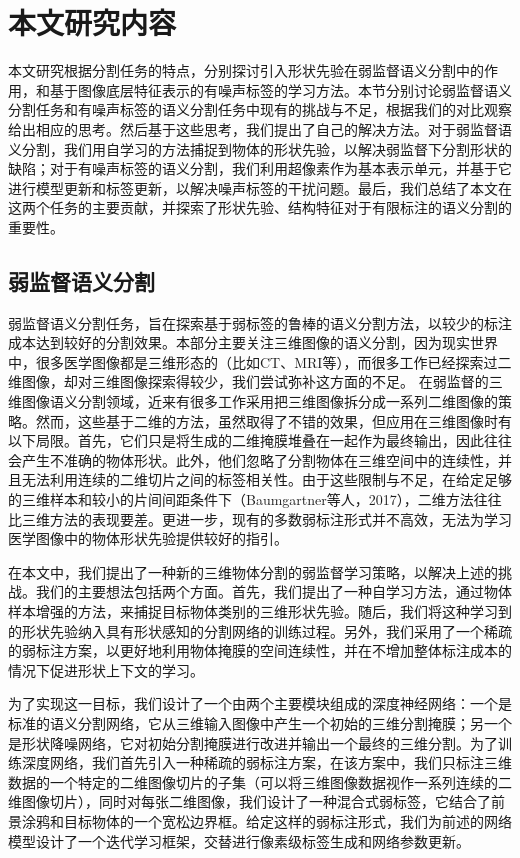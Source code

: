\section{本文研究内容}
本文研究根据分割任务的特点，分别探讨引入形状先验在弱监督语义分割中的作用，和基于图像底层特征表示的有噪声标签的学习方法。本节分别讨论弱监督语义分割任务和有噪声标签的语义分割任务中现有的挑战与不足，根据我们的对比观察给出相应的思考。然后基于这些思考，我们提出了自己的解决方法。对于弱监督语义分割，我们用自学习的方法捕捉到物体的形状先验，以解决弱监督下分割形状的缺陷；对于有噪声标签的语义分割，我们利用超像素作为基本表示单元，并基于它进行模型更新和标签更新，以解决噪声标签的干扰问题。最后，我们总结了本文在这两个任务的主要贡献，并探索了形状先验、结构特征对于有限标注的语义分割的重要性。

\subsection{弱监督语义分割}
弱监督语义分割任务，旨在探索基于弱标签的鲁棒的语义分割方法，以较少的标注成本达到较好的分割效果。本部分主要关注三维图像的语义分割，因为现实世界中，很多医学图像都是三维形态的（比如CT、MRI等），而很多工作已经探索过二维图像，却对三维图像探索得较少，我们尝试弥补这方面的不足。
在弱监督的三维图像语义分割领域，近来有很多工作采用把三维图像拆分成一系列二维图像的策略。然而，这些基于二维的方法，虽然取得了不错的效果，但应用在三维图像时有以下局限。首先，它们只是将生成的二维掩膜堆叠在一起作为最终输出，因此往往会产生不准确的物体形状\citep{kervadec2019constrained,2020bounding}。此外，他们忽略了分割物体在三维空间中的连续性，并且无法利用连续的二维切片之间的标签相关性。由于这些限制与不足，在给定足够的三维样本和较小的片间间距条件下（Baumgartner等人，2017），二维方法往往比三维方法的表现要差。更进一步，现有的多数弱标注形式并不高效，无法为学习医学图像中的物体形状先验提供较好的指引。

在本文中，我们提出了一种新的三维物体分割的弱监督学习策略，以解决上述的挑战。我们的主要想法包括两个方面。首先，我们提出了一种自学习方法，通过物体样本增强的方法，来捕捉目标物体类别的三维形状先验。随后，我们将这种学习到的形状先验纳入具有形状感知的分割网络的训练过程。另外，我们采用了一个稀疏的弱标注方案，以更好地利用物体掩膜的空间连续性，并在不增加整体标注成本的情况下促进形状上下文的学习。

为了实现这一目标，我们设计了一个由两个主要模块组成的深度神经网络：一个是标准的语义分割网络，它从三维输入图像中产生一个初始的三维分割掩膜；另一个是形状降噪网络，它对初始分割掩膜进行改进并输出一个最终的三维分割。为了训练深度网络，我们首先引入一种稀疏的弱标注方案，在该方案中，我们只标注三维数据的一个特定的二维图像切片的子集（可以将三维图像数据视作一系列连续的二维图像切片），同时对每张二维图像，我们设计了一种混合式弱标签，它结合了前景涂鸦和目标物体的一个宽松边界框。给定这样的弱标注形式，我们为前述的网络模型设计了一个迭代学习框架，交替进行像素级标签生成和网络参数更新。

